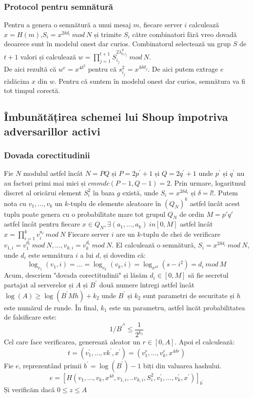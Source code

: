\documentclass[12]{article}
\begin{document}
\subsubsection{Protocol pentru semnătură}
Pentru a genera o semnătură a unui mesaj $m$, fiecare server $i$ calculează $x=H(m)$,$S_i = x^{2 \delta d_i}  \ mod \ N$ și trimite $S_i$ către combinatori fără vreo dovadă deoarece sunt în modelul onest dar curios. Combinatorul selectează un grup $S$ de $t+1$ valori și calculează $ w = \prod_{j=1}^{t+1} S_{i_j}^{2 \lambda_{0,i_{j}}^{S} } \ mod \ N$. \\
De aici rezultă că $w^{e} = x^{4 \delta^2}$ pentru că $s_{i_j}^{2} = x^{4 \delta d_j}$. De aici putem extrage $e$ rădăcina $x$ din $w$. Pentru că suntem în modelul onest dar curios, semnătura va fi tot timpul corectă.

\subsection{Îmbunătățirea schemei lui Shoup împotriva adversarillor activi}
\subsubsection{Dovada corectitudinii}
Fie $N$ modulul astfel încât $N=PQ$ și $P = 2p^{'} +1 $ și $Q= 2q^{'} +1 $ unde $p^{'}$ și $q^{'}$ nu au factori primi mai mici și $cmmdc(P-1,Q-1)=2$. Prin urmare, logaritmul discret al oricărui element $S_i^{2}$ în baza $g$ există, unde $S_i = x^{2 \delta d_i}$ și $\delta = l!$. Putem nota cu $v_1,...,v_k$ un $k$-tuplu de elemente aleatoare în $(Q_N)^k$ astfel încât acest tuplu poate genera cu o probabilitate mare tot grupul $Q_N$ de ordin $M=p'q'$ astfel încât pentru fiecare $x \in Q_N, \exists (a_1,...,a_k) \ in [0,M] $ astfel încât $x = \prod_{i=1}^{k} v_i^{a_i} \ mod \ N$
Fiecare server $i$ are un $k$-tuplu de chei de verificare $v_{1,i} = v_1^{d_i} \ mod \ N,...,v_{k,i} = v_k^{d_i} \ mod \ N$. El calculează o semnătură, $S_i = x^{2 \delta d_i} \ mod \ N$, unde $d_i$ este semnătura $i$ a lui $d$, și dovedim că:
$$ \log_{v_1} (v_1,i) = ... = \log_{v_k} (v_k,i) = \log_{x^{4 \delta}} (s-{i}^{2}) = d_i \ mod \ M $$
Acum, descriem "dovada corectitudinii" și lăsăm $d_i \in [0,M]$ să fie secretul partajat al serverelor și $A$ și $B^{'}$ două numere întregi astfel încât $\log(A) \geqslant \log(B^{'} Mh) +k_2$ unde $B^{'}$ și $k_2$ sunt parametri de securitate și $h$ este numărul de runde. În final, $k_1$ este un parametru, astfel încăt probabilitatea de falsificare este:
$$1/B^{'^{h}} \leqslant \frac{1}{2^{k_1}}$$
Cel care face verificarea, generează aleator un $r \in [0,A]$. Apoi el calculează:
$$t= (v_{1}^{'},...,v{k}^{'},x^{'})=(v_{1}^{r},...,v_{k}^{r},x^{4 \delta r})$$
Fie $e$, reprezentând primii $b^{'} =\log(B^{'})-1$ biți din valuarea hashului.
$$ e= [H(v_1,...,v_k,x^{4 \delta},v_{1,i},..v_{k,i},S_{i}^{2},v_{1}^{'},...,v_{k}^{'},x^{'})]_{b^{'}} $$
Și verificăm dacă $0 \leqslant z \leqslant A $
\end{document}
